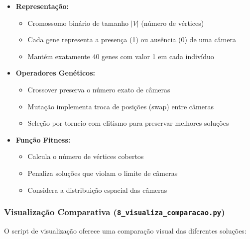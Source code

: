 \documentclass[12pt, a4paper]{report}
\begin{document}
\begin{itemize}
    \item \textbf{Representação:}
    \begin{itemize}
        \item Cromossomo binário de tamanho \(\lvert V \rvert\) (número de vértices)
        \item Cada gene representa a presença (1) ou ausência (0) de uma câmera
        \item Mantém exatamente 40 genes com valor 1 em cada indivíduo
    \end{itemize}
    
    \item \textbf{Operadores Genéticos:}
    \begin{itemize}
        \item Crossover preserva o número exato de câmeras
        \item Mutação implementa troca de posições (swap) entre câmeras
        \item Seleção por torneio com elitismo para preservar melhores soluções
    \end{itemize}
    
    \item \textbf{Função Fitness:}
    \begin{itemize}
        \item Calcula o número de vértices cobertos
        \item Penaliza soluções que violam o limite de câmeras
        \item Considera a distribuição espacial das câmeras
    \end{itemize}
\end{itemize}

\subsubsection{Visualização Comparativa (\texttt{8\_visualiza\_comparacao.py})}
O script de visualização oferece uma comparação visual das diferentes soluções:
\end{document}
